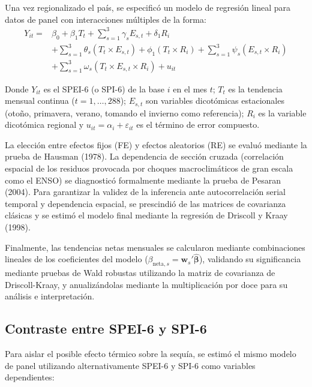 \documentclass[11pt,a4paper]{article}
\begin{document}
Una vez regionalizado el país, se especificó un modelo de regresión lineal para datos de panel con interacciones múltiples de la forma:
\begin{equation}
\begin{split}
    Y_{it} = & \beta_0 + \beta_1 T_t + \sum_{s=1}^{3} \gamma_s E_{s,t} + \delta_1 R_i \\
    & + \sum_{s=1}^{3} \theta_s (T_t \times E_{s,t}) + \phi_1 (T_t \times R_i) + \sum_{s=1}^{3} \psi_s (E_{s,t} \times R_i) \\
    & + \sum_{s=1}^{3} \omega_s (T_t \times E_{s,t} \times R_i) + u_{it}
\end{split}
\label{eq:modelo_completo}
\end{equation}

Donde $Y_{it}$ es el SPEI-6 (o SPI-6) de la base $i$ en el mes $t$; $T_t$ es la tendencia mensual continua ($t = 1, \dots, 288$); $E_{s,t}$ son variables dicotómicas estacionales (otoño, primavera, verano, tomando el invierno como referencia); $R_i$ es la variable dicotómica regional y $u_{it} = \alpha_i + \varepsilon_{it}$ es el término de error compuesto. 

La elección entre efectos fijos (FE) y efectos aleatorios (RE) se evaluó mediante la prueba de Hausman (1978). La dependencia de sección cruzada (correlación espacial de los residuos provocada por choques macroclimáticos de gran escala como el ENSO) se diagnosticó formalmente mediante la prueba de Pesaran (2004). Para garantizar la validez de la inferencia ante autocorrelación serial temporal y dependencia espacial, se prescindió de las matrices de covarianza clásicas y se estimó el modelo final mediante la regresión de Driscoll y Kraay (1998).

Finalmente, las tendencias netas mensuales se calcularon mediante combinaciones lineales de los coeficientes del modelo ($\beta_{\text{neta},s} = \mathbf{w}_s' \boldsymbol{\hat{\beta}}$), validando su significancia mediante pruebas de Wald robustas utilizando la matriz de covarianza de Driscoll-Kraay, y anualizándolas mediante la multiplicación por doce para su análisis e interpretación.

\subsection{Contraste entre SPEI-6 y SPI-6}

Para aislar el posible efecto térmico sobre la sequía, se estimó el mismo modelo de panel utilizando alternativamente SPEI-6 y SPI-6 como variables dependientes:
\end{document}
